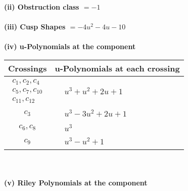 \documentclass[1p]{elsarticle_modified}
\theoremstyle{definition}
\begin{document}
\flushleft \textbf{(ii) Obstruction class $= -1$}\\~\\
\flushleft \textbf{(iii) Cusp Shapes $= -4 u^2-4 u-10$}\\~\\
\newpage\renewcommand{\arraystretch}{1}
\flushleft \textbf{(iv) u-Polynomials at the component}\newline \\
\begin{tabular}{m{50pt}|m{274pt}}
Crossings & \hspace{64pt}u-Polynomials at each crossing \\
\hline $$\begin{aligned}c_{1},c_{2},c_{4}\\c_{5},c_{7},c_{10}\\c_{11},c_{12}\end{aligned}$$&$\begin{aligned}
&u^3+u^2+2 u+1
\end{aligned}$\\
\hline $$\begin{aligned}c_{3}\end{aligned}$$&$\begin{aligned}
&u^3-3 u^2+2 u+1
\end{aligned}$\\
\hline $$\begin{aligned}c_{6},c_{8}\end{aligned}$$&$\begin{aligned}
&u^3
\end{aligned}$\\
\hline $$\begin{aligned}c_{9}\end{aligned}$$&$\begin{aligned}
&u^3- u^2+1
\end{aligned}$\\
\hline
\end{tabular}\\~\\
\newpage\renewcommand{\arraystretch}{1}
\flushleft \textbf{(v) Riley Polynomials at the component}\newline \\
\end{document}
